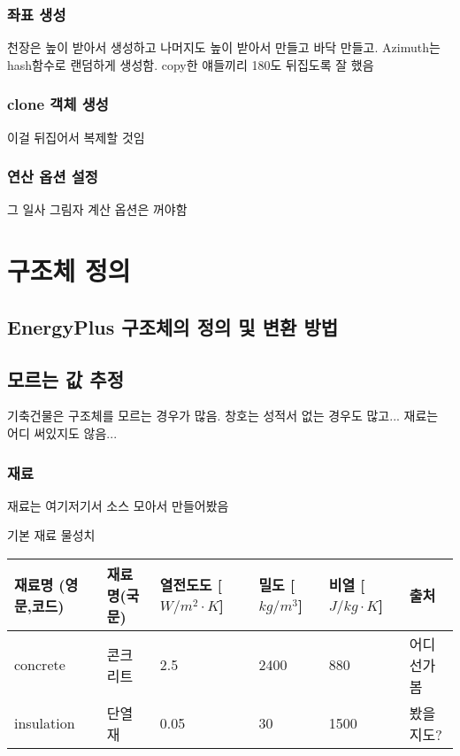 \subsubsection{좌표 생성}
천장은 높이 받아서 생성하고 나머지도 높이 받아서 만들고 바닥 만들고.
Azimuth는 hash함수로 랜덤하게 생성함. copy한 얘들끼리 180도 뒤집도록 잘 했음

\subsubsection{clone 객체 생성}
이걸 뒤집어서 복제할 것임

\subsubsection{연산 옵션 설정}
그 일사 그림자 계산 옵션은 꺼야함


\section{구조체 정의}
\subsection{EnergyPlus 구조체의 정의 및 변환 방법}
\subsection{모르는 값 추정}
기축건물은 구조체를 모르는 경우가 많음. 창호는 성적서 없는 경우도 많고... 재료는 어디 써있지도 않음...
\subsubsection{재료}
재료는 여기저기서 소스 모아서 만들어봤음
\begin{defaulttable}
  \caption{기본 재료 물성치}
  \begin{tabularx}{\textwidth}{X X X X X X}
    \toprule
    재료명 (영문,코드) & 재료명(국문) & 열전도도 [$W/m^{2}\cdot K$] & 밀도 [$kg/m^{3}$] & 비열 [$J/kg\cdot K$] & 출처 \\
    \midrule
    concrete   & 콘크리트 & 2.5 & 2400 & 880 & 어디선가 봄\\
    insulation & 단열재   & 0.05 & 30 & 1500 & 봤을지도?  \\
    \bottomrule
  \end{tabularx}
\end{defaulttable}

